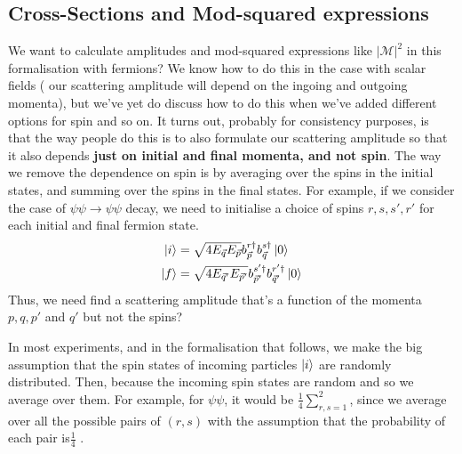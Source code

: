 \subsection{Cross-Sections and Mod-squared expressions}
We want to calculate amplitudes and mod-squared 
expressions like $ | \mathcal{ M } | ^ 2 $ in this 
formalisation with fermions? We know 
how to do this in the case with scalar fields (
our scattering amplitude will depend on the ingoing and 
outgoing momenta), 
but we've yet do discuss how to do this when we've 
added different options for spin and so on. 
It turns out, probably for consistency purposes, is  
that the way people do this is to also 
formulate our scattering amplitude so that it also 
depends \textbf{just on initial and final momenta, and 
not spin}. The way we remove the dependence on spin 
is by averaging over the spins in the initial states, 
and summing over the spins in the final states. 
For example, if we consider the case of $ \psi \psi \to \psi \psi $ 
decay, we need to initialise a choice of spins $ r, s, s' , r' $ for each initial and final fermion
state. 
\begin{align*}
	\ket{ i }  &= \sqrt{ 4 E_{ \vec{q} } E _{ \vec{p} }  }  
	b_{ \vec{p} } ^{ r \dagger } b _{ \vec{q} } ^{ s \dagger } \ket{ 0 } \\
	\ket{ f } &=  \sqrt{ 4 E_{ \vec{q} ' } E _{\vec{p} ' } }  
	b_{ \vec{p} ' } ^{ s ' \dagger } b _{\vec{q} ' } ^{ r ' \dagger } \ket{ 0 } 
\end{align*}
Thus, we need find a scattering amplitude that's a function 
of the momenta $ p , q , p ' $ and $ q ' $ but not the spins? 

In most experiments, and in the formalisation that follows, we make the big assumption that 
the spin states of incoming particles $ \ket{ i } $ are randomly 
distributed. Then, because the incoming spin states are random 
and so we average over them. For example, for 
$ \psi \psi $, it would be $ \frac{1}{4 } \sum_{ r , s = 1 } ^ 2 $, 
since we average over all the possible pairs of 
$ \left( r, s   \right)  $ with the assumption 
that the probability of each pair is$ \frac{1}{4 }$ . 

